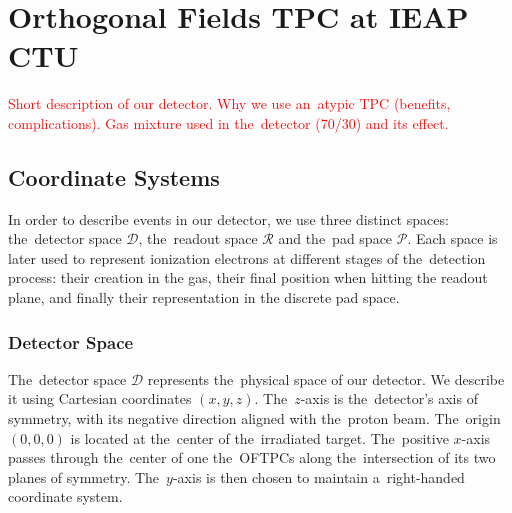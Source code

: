			
	
	\section{Orthogonal Fields TPC at IEAP CTU}
	\label{sec:oftpc}
		\textcolor{red}{Short description of our detector. Why we use an~atypic TPC (benefits, complications). Gas mixture used in the~detector (70/30) and its effect.}
	
		\subsection{Coordinate Systems}
		\label{sec:coor}
			In order to describe events in our detector, we use three distinct spaces: the~detector space $\mathcal{D}$, the~readout space $\mathcal{R}$ and the~pad space $\mathcal{P}$. Each space is later used to represent ionization electrons at different stages of the~detection process: their creation in the gas, their final position when hitting the readout plane, and finally their representation in the discrete pad space.
		
			\subsubsection{Detector Space}
				The~detector space $\mathcal{D}$ represents the~physical space of our detector. We describe it using Cartesian coordinates $(x,y,z)$. The~$z$-axis is the~detector's axis of symmetry, with its negative direction aligned with the~proton beam. The~origin $(0,0,0)$ is located at the~center of the~irradiated target. The~positive $x$\nobreakdash-axis passes through the~center of one the~\ac{OFTPC}s along the~intersection of its two planes of symmetry. The~$y$\nobreakdash-axis is then chosen to maintain a~right-handed coordinate system.
				
